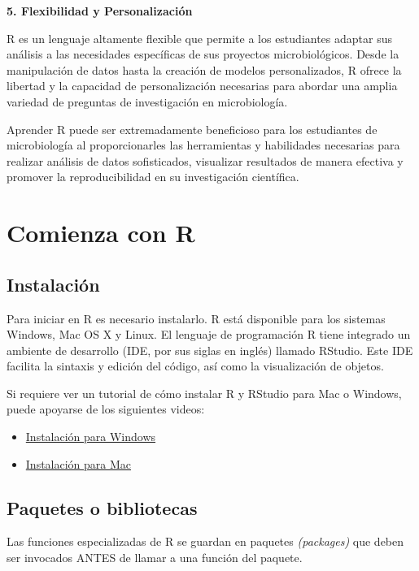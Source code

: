 \documentclass[
]{book}
\begin{document}
\textbf{5. Flexibilidad y Personalización}

R es un lenguaje altamente flexible que permite a los estudiantes adaptar sus análisis a las necesidades específicas de sus proyectos microbiológicos. Desde la manipulación de datos hasta la creación de modelos personalizados, R ofrece la libertad y la capacidad de personalización necesarias para abordar una amplia variedad de preguntas de investigación en microbiología.

Aprender R puede ser extremadamente beneficioso para los estudiantes de microbiología al proporcionarles las herramientas y habilidades necesarias para realizar análisis de datos sofisticados, visualizar resultados de manera efectiva y promover la reproducibilidad en su investigación científica.

\section{Comienza con R}\label{comienza-con-r}

\subsection{Instalación}\label{instalaciuxf3n}

Para iniciar en R es necesario instalarlo. R está disponible para los sistemas Windows, Mac OS X y Linux. El lenguaje de programación R tiene integrado un ambiente de desarrollo (IDE, por sus siglas en inglés) llamado RStudio. Este IDE facilita la sintaxis y edición del código, así como la visualización de objetos.

Si requiere ver un tutorial de cómo instalar R y RStudio para Mac o Windows, puede apoyarse de los siguientes videos:

\begin{itemize}
\item
  \href{https://www.youtube.com/watch?v=mZlt25hBWg8&t=2s}{Instalación para Windows}
\item
  \href{https://www.youtube.com/watch?v=OW66f1sBQOc}{Instalación para Mac}
\end{itemize}

\subsection{Paquetes o bibliotecas}\label{paquetes-o-bibliotecas}

Las funciones especializadas de R se guardan en paquetes \emph{(packages)} que deben ser invocados ANTES de llamar a una función del paquete.
\end{document}
